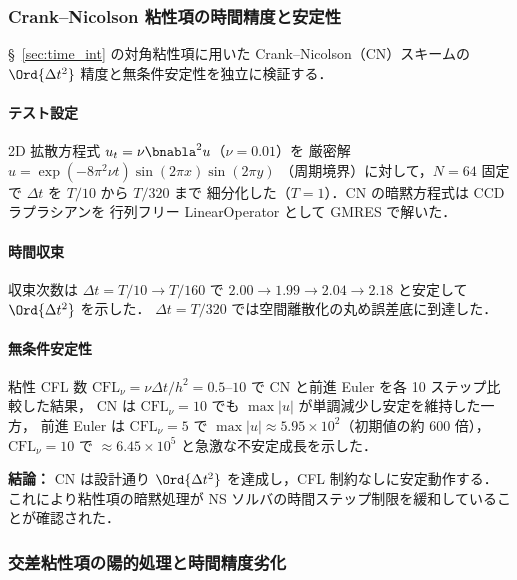 \subsubsection{Crank--Nicolson 粘性項の時間精度と安定性}
\label{sec:verify_cn_viscous}

§~\ref{sec:time_int} の対角粘性項に用いた Crank--Nicolson（CN）スキームの
$\Ord{\Delta t^2}$ 精度と無条件安定性を独立に検証する．

\paragraph{テスト設定}
2D 拡散方程式 $u_t = \nu \bnabla^2 u$（$\nu = 0.01$）を
厳密解 $u = \exp(-8\pi^2\nu t)\sin(2\pi x)\sin(2\pi y)$
（周期境界）に対して，$N = 64$ 固定で $\Delta t$ を $T/10$ から $T/320$ まで
細分化した（$T = 1$）．CN の暗黙方程式は CCD ラプラシアンを
行列フリー LinearOperator として GMRES で解いた．

\paragraph{時間収束}
収束次数は $\Delta t = T/10 \to T/160$ で
$2.00 \to 1.99 \to 2.04 \to 2.18$ と安定して $\Ord{\Delta t^2}$ を示した．
$\Delta t = T/320$ では空間離散化の丸め誤差底に到達した．

\paragraph{無条件安定性}
粘性 CFL 数 $\mathrm{CFL}_\nu = \nu\Delta t / h^2 = 0.5$--$10$ で
CN と前進 Euler を各 10 ステップ比較した結果，
CN は $\mathrm{CFL}_\nu = 10$ でも $\max|u|$ が単調減少し安定を維持した一方，
前進 Euler は $\mathrm{CFL}_\nu = 5$ で $\max|u| \approx 5.95 \times 10^2$（初期値の約 600 倍），
$\mathrm{CFL}_\nu = 10$ で $\approx 6.45 \times 10^5$ と急激な不安定成長を示した．

\noindent\textbf{結論：}
CN は設計通り $\Ord{\Delta t^2}$ を達成し，CFL 制約なしに安定動作する．
これにより粘性項の暗黙処理が NS ソルバの時間ステップ制限を緩和していることが確認された．


\subsubsection{交差粘性項の陽的処理と時間精度劣化}
\label{sec:verify_cross_viscous}

